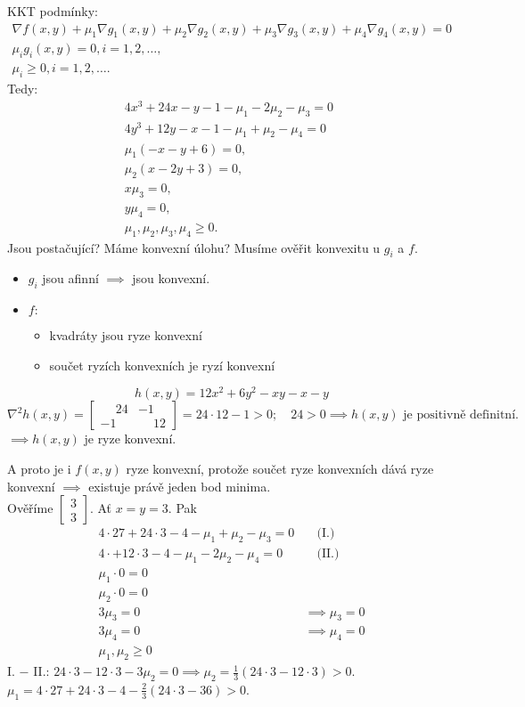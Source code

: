 KKT podmínky: 
\begin{align*}
    \nabla f(x, y) + \mu_1 \nabla g_1(x, y) + \mu_2 \nabla g_2(x, y) + \mu_3 \nabla g_3(x, y) + \mu_4 \nabla g_4(x, y) = 0 \\
    \mu_i g_i (x,y) = 0, i = 1,2,\dots,\\
    \mu_i \geq 0, i = 1,2,\dots.
\end{align*}
Tedy:
\begin{align*}
    4x^3 + 24x - y - 1 - \mu_1 - 2\mu_2 - \mu_3 = 0\phantom{,} \\
    4y^3 + 12y - x - 1 - \mu_1 + \mu_2 - \mu_4 = 0\phantom{,} \\
    \mu_1(-x-y+6) = 0, \\
    \mu_2(x-2y+3) = 0, \\
    x \mu_3 = 0, \\
    y \mu_4 = 0, \\
    \mu_1, \mu_2, \mu_3, \mu_4 \geq 0.
\end{align*}
Jsou postačující? Máme konvexní úlohu? Musíme ověřit konvexitu u $g_i$ a $f$.
\begin{itemize}
    \item $g_i$ jsou afinní $\implies$ jsou konvexní.
    \item $f:$
    \begin{itemize}
        \item kvadráty jsou ryze konvexní
        \item součet ryzích konvexních je ryzí konvexní
    \end{itemize} 
\end{itemize}
\[h(x, y) = 12x^2 + 6y^2 - xy -x -y\]
\[
    \nabla^2 h (x, y) = 
    \begin{bmatrix}
        \phantom{-}24 & -1 \\
        -1 & \phantom{-}12
    \end{bmatrix} = 24 \cdot 12 - 1 > 0; \quad 24 > 0 \implies h(x, y)\text{ je positivně definitní.}
\]
$\implies h(x, y)$ je ryze konvexní.

A proto je i $f(x, y)$ ryze konvexní, protože součet ryze konvexních dává ryze konvexní $\implies$ existuje právě jeden 
bod minima.\\
Ověříme $\begin{bmatrix} 3 \\ 3 \end{bmatrix}$. Ať $x=y=3$. Pak
\begin{align*}
    4 \cdot 27 + 24 \cdot 3 - 4 - \mu_1 + \mu_2 - \mu_3 = 0& \quad \text{(I.)} \\
    4 \cdot + 12 \cdot 3 - 4 - \mu_1 - 2\mu_2 - \mu_4 = 0& \quad \text{(II.)}\\
    \mu_1 \cdot 0 = 0& \\
    \mu_2 \cdot 0 = 0& \\
    3 \mu_3 = 0& \implies \mu_3 = 0\\
    3 \mu_4 = 0& \implies \mu_4 = 0\\
    \mu_1, \mu_2 \geq 0&
\end{align*}
I. $-$ II.: $24 \cdot 3 - 12 \cdot 3 - 3 \mu_2 = 0 \implies \mu_2 = \frac{1}{3} (24 \cdot 3 - 12 \cdot 3) > 0$.\\
$\mu_1 = 4 \cdot 27 + 24 \cdot 3 - 4 - \frac{2}{3}(24 \cdot 3 - 36) > 0$.

